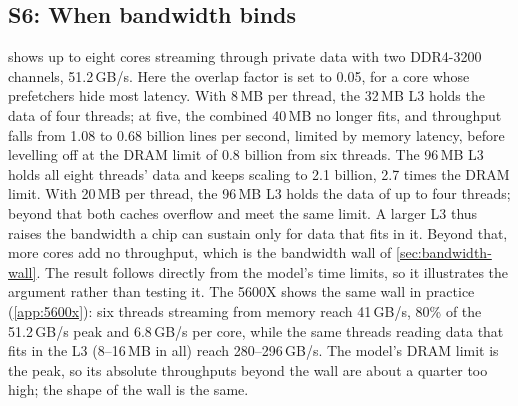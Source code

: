\subsection{S6: When bandwidth binds}
\label{sec:sim-bandwidth}
 shows up to eight cores streaming through private data with two DDR4-3200 channels, 51.2\,GB/s. Here the overlap factor is set to 0.05, for a core whose prefetchers hide most latency. With 8\,MB per thread, the 32\,MB L3 holds the data of four threads; at five, the combined 40\,MB no longer fits, and throughput falls from 1.08 to 0.68 billion lines per second, limited by memory latency, before levelling off at the DRAM limit of 0.8 billion from six threads. The 96\,MB L3 holds all eight threads' data and keeps scaling to 2.1 billion, 2.7 times the DRAM limit. With 20\,MB per thread, the 96\,MB L3 holds the data of up to four threads; beyond that both caches overflow and meet the same limit. A larger L3 thus raises the bandwidth a chip can sustain only for data that fits in it. Beyond that, more cores add no throughput, which is the bandwidth wall of \cref{sec:bandwidth-wall}. The result follows directly from the model's time limits, so it illustrates the argument rather than testing it. The 5600X shows the same wall in practice (\cref{app:5600x}): six threads streaming from memory reach 41\,GB/s, 80\% of the 51.2\,GB/s peak and 6.8\,GB/s per core, while the same threads reading data that fits in the L3 (8--16\,MB in all) reach 280--296\,GB/s. The model's DRAM limit is the peak, so its absolute throughputs beyond the wall are about a quarter too high; the shape of the wall is the same.

